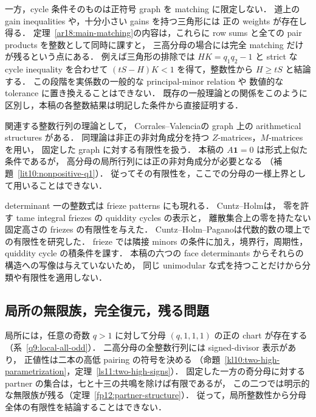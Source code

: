一方，cycle 条件そのものは正符号 graph を matching に限定しない．
道上の gain inequalities や，十分小さい gains を持つ三角形には
正の weights が存在し得る．
定理~\ref{ar18:main-matching}の内容は，これらに
row sums と全ての pair products を整数として同時に課すと，
三高分母の場合には完全 matching だけが残るという点にある．
例えば三角形の排除では $HK=q_1q_2-1$ と strict な cycle inequality を合わせて
$(tS-H)K<1$ を得て，整数性から $H\ge tS$ と結論する．
この段階を実係数の一般的な principal-minor relation や
数値的な tolerance に置き換えることはできない．
既存の一般理論との関係をこのように区別し，本稿の各整数結果は明記した条件から直接証明する．

関連する整数行列の理論として，
Corrales--Valencia\cite[\S\S2--3]{CorralesValencia}の graph 上の arithmetical structures がある．
同理論は非正の非対角成分を持つ $Z$-matrices，$M$-matrices を用い，
固定した graph に対する有限性を扱う．
本稿の $A\mathbf1=0$ は形式上似た条件であるが，
高分母の局所行列には正の非対角成分が必要となる
（補題~\ref{lit10:nonpositive-q1}）．
従ってその有限性を，ここでの分母の一様上界として用いることはできない．

determinant 一の整数式は frieze patterns にも現れる．
Cuntz--Holm\cite[\S\S2--3 and~7]{CuntzHolmFriezes}は，
零を許す tame integral friezes の quiddity cycles の表示と，
離散集合上の零を持たない固定高さの friezes の有限性を与えた．
Cuntz--Holm--Pagano\cite{CuntzHolmPagano}は代数的数の環上での有限性を研究した．
frieze では隣接 minors の条件に加え，境界行，周期性，quiddity cycle の積条件を課す．
本稿の六つの face determinants からそれらの構造への写像は与えていないため，
同じ unimodular な式を持つことだけから分類や有限性を適用しない．

\subsection{局所の無限族，完全復元，残る問題}

局所には，任意の奇数 $q>1$ に対して分母 $(q,1,1,1)$ の正の chart が存在する
（系~\ref{q9:local-all-odd}）．
二高分母の全整数行列には signed-divisor 表示があり，
正値性は二本の高低 pairing の符号を決める
（命題~\ref{kl10:two-high-parametrization}，定理~\ref{ls11:two-high-signs}）．
固定した一方の奇分母に対する partner の集合は，七と十三の共鳴を除けば有限であるが，
この二つでは明示的な無限族が残る（定理~\ref{fp12:partner-structure}）．
従って，局所整数性から分母全体の有限性を結論することはできない．

